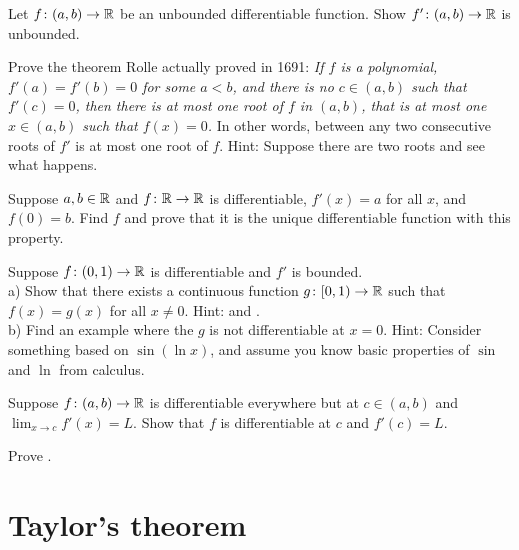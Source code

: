 \begin{exercise}
Let $f \colon (a,b) \to {\mathbb{R}}$ be an unbounded differentiable function.  Show
$f' \colon (a,b) \to {\mathbb{R}}$ is unbounded.
\end{exercise}

\begin{exercise}
Prove the theorem Rolle actually proved in 1691:
\emph{If $f$ is a polynomial,
$f'(a) = f'(b) = 0$ for some $a < b$,
and there is no $c \in (a,b)$ such that $f'(c) = 0$,
then there is at most one root of $f$ in $(a,b)$,
that is at most one $x \in (a,b)$ such that $f(x) = 0$.}
In other words, between any two consecutive roots of $f'$ is at most one
root of $f$.
Hint: Suppose there are two roots and see what happens.
\end{exercise}

\begin{exercise}
Suppose $a,b \in {\mathbb{R}}$ and $f \colon {\mathbb{R}} \to {\mathbb{R}}$ is differentiable,
$f'(x) = a$ for all $x$, and $f(0) = b$.  Find $f$ and prove that 
it is the unique differentiable function with this property.
\end{exercise}

\begin{exercise} \label{exercise:extendboundedder}
Suppose $f \colon (0,1) \to {\mathbb{R}}$ is differentiable and $f'$
is bounded.\\
a) Show that there exists a continuous function $g \colon [0,1) \to {\mathbb{R}}$
such that $f(x) = g(x)$ for all $x \not= 0$.  Hint:  and
.
\\
b) Find an example where the $g$ is not differentiable at $x=0$.
Hint: Consider something based on $\sin(\ln x)$,
and assume you know basic properties of
$\sin$ and $\ln$ from calculus.
\end{exercise}

\begin{exercise}
Suppose $f \colon (a,b) \to {\mathbb{R}}$ is differentiable everywhere but at $c \in
(a,b)$ and $\lim_{x \to c} f'(x) = L$.  Show that $f$ is differentiable at
$c$ and $f'(c) = L$.
\end{exercise}

\begin{exercise}
Prove .
\end{exercise}


\sectionnewpage
\section{Taylor's theorem}
\label{sec:taylor}

